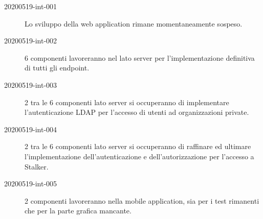 \documentclass{article}
\begin{document}
\begin{description}
  \item[20200519-int-001] Lo sviluppo della web application rimane momentaneamente sospeso.
  \item[20200519-int-002] 6 componenti lavoreranno nel lato server per l'implementazione definitiva di tutti gli endpoint.
  \item[20200519-int-003] 2 tra le 6 componenti lato server si occuperanno di implementare l'autenticazione LDAP per l'accesso di utenti ad organizzazioni private.
  \item[20200519-int-004] 2 tra le 6 componenti lato server si occuperanno di raffinare ed ultimare l'implementazione dell'autenticazione e dell'autorizzazione per l'accesso a Stalker.
  \item[20200519-int-005] 2 componenti lavoreranno nella mobile application, sia per i test rimanenti che per la parte grafica mancante.
\end{description}

\end{document}
